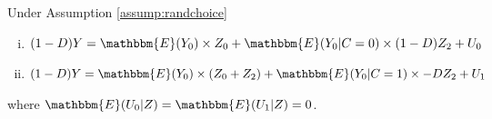 \begin{appendix}
\begin{prop}
\label{prop:ASBreg}
Under Assumption \ref{assump:randchoice}
\begin{enumerate}[(i)]
    \item $(1 - D) Y = \mathbbm{E}(Y_{0}) \times Z_0 + \mathbbm{E}(Y_{0}|C=0) \times (1 - D)Z_2 + U_{0}$
    \item  $(1 - D) Y = \mathbbm{E}(Y_{0}) \times(Z_0 + Z_2) + \mathbbm{E}(Y_{0}|C=1)\times -DZ_2 + U_{1}$
\end{enumerate}
where $\mathbbm{E}(U_0|Z) = \mathbbm{E}(U_1|Z) = 0$.
\end{prop}


\end{appendix}
